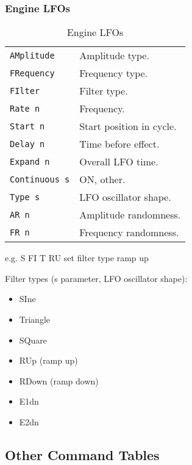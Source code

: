 \subsubsection{Engine LFOs}
\label{subsec:command_line_engine_lfos}

   \begin{table}[H]
      \centering
      \caption{Engine LFOs}
      \label{table:yoshimi_engine_lfos}
      \begin{tabular}{l l}

\texttt{AMplitude} &
   Amplitude type. \\
\texttt{FRequency} &
   Frequency type. \\
\texttt{FIlter} &
   Filter type. \\
\texttt{Rate n} &
   Frequency. \\
\texttt{Start n} &
   Start position in cycle. \\
\texttt{Delay n} &
   Time before effect. \\
\texttt{Expand n} &
   Overall LFO time. \\
\texttt{Continuous s} &
   ON, other. \\
\texttt{Type s} &
   LFO oscillator shape. \\
\texttt{AR n} &
   Amplitude randomness. \\
\texttt{FR n} &
   Frequency randomness. \\

      \end{tabular}
   \end{table}

  e.g. S FI T RU              set filter type ramp up

Filter types (s parameter, LFO oscillator shape):

   \begin{itemize}
      \item SIne
      \item Triangle
      \item SQuare
      \item RUp (ramp up)
      \item RDown (ramp down)
      \item E1dn
      \item E2dn
   \end{itemize}

\subsection{Other Command Tables}
\label{subsec:command_line_other_command_tables}

